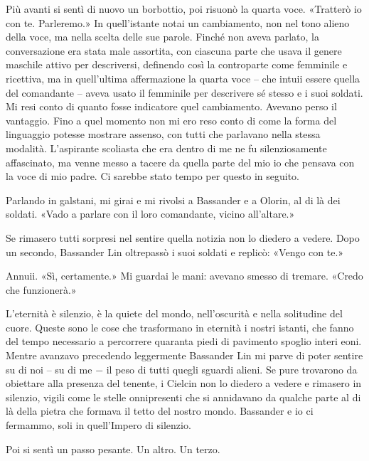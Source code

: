 Più avanti si sentì di nuovo un borbottio, poi risuonò la quarta voce.
«Tratterò io con te. Parleremo.» In quell'istante notai un cambiamento,
non nel tono alieno della voce, ma nella scelta delle sue parole. Finché
non aveva parlato, la conversazione era stata male assortita, con
ciascuna parte che usava il genere maschile attivo per descriversi,
definendo così la controparte come femminile e ricettiva, ma in
quell'ultima affermazione la quarta voce -- che intuii essere quella del
comandante -- aveva usato il femminile per descrivere sé stesso e i suoi
soldati. Mi resi conto di quanto fosse indicatore quel cambiamento.
Avevano perso il vantaggio. Fino a quel momento non mi ero reso conto di
come la forma del linguaggio potesse mostrare assenso, con tutti che
parlavano nella stessa modalità. L'aspirante scoliasta che era dentro di
me ne fu silenziosamente affascinato, ma venne messo a tacere da quella
parte del mio io che pensava con la voce di mio padre. Ci sarebbe stato
tempo per questo in seguito.

Parlando in galstani, mi girai e mi rivolsi a Bassander e a Olorin, al
di là dei soldati. «Vado a parlare con il loro comandante, vicino
all'altare.»

Se rimasero tutti sorpresi nel sentire quella notizia non lo diedero a
vedere. Dopo un secondo, Bassander Lin oltrepassò i suoi soldati e
replicò: «Vengo con te.»

Annuii. «Sì, certamente.» Mi guardai le mani: avevano smesso di tremare.
«Credo che funzionerà.»

\begin{figure}
	\centering
	\def\svgwidth{\columnwidth}
	\scalebox{0.2}{}
\end{figure}

L'eternità è silenzio, è la quiete del mondo, nell'oscurità e nella
solitudine del cuore. Queste sono le cose che trasformano in eternità i
nostri istanti, che fanno del tempo necessario a percorrere quaranta
piedi di pavimento spoglio interi eoni. Mentre avanzavo precedendo
leggermente Bassander Lin mi parve di poter sentire su di noi -- su di
me − il peso di tutti quegli sguardi alieni. Se pure trovarono da
obiettare alla presenza del tenente, i Cielcin non lo diedero a vedere e
rimasero in silenzio, vigili come le stelle onnipresenti che si
annidavano da qualche parte al di là della pietra che formava il tetto
del nostro mondo. Bassander e io ci fermammo, soli in quell'Impero di
silenzio.

Poi si sentì un passo pesante. Un altro. Un terzo.

